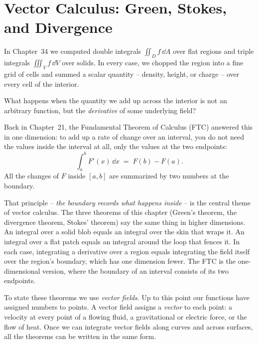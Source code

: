 \chapter{Vector Calculus: Green, Stokes, and Divergence}

\providecommand{\oiint}{\oint\kern-0.62em\oint}

In Chapter~34 we computed double integrals $\iint_D f\,\dd A$ over flat regions
and triple integrals $\iiint_V f\,\dd V$ over solids. In every case, we chopped
the region into a fine grid of cells and summed a scalar quantity -- density,
height, or charge -- over every cell of the interior.

What happens when the quantity we add up across the interior is not an arbitrary
function, but the \emph{derivative} of some underlying field?

Back in Chapter~21, the Fundamental Theorem of Calculus (FTC) answered this in one
dimension: to add up a rate of change over an interval, you do not need the values
inside the interval at all, only the values at the two endpoints:
\[
  \int_a^b F'(x)\,\dd x \;=\; F(b) - F(a).
\]
All the changes of $F$ inside $[a,b]$ are summarized by two numbers at the
boundary.

That principle -- \emph{the boundary records what happens inside} -- is the central
theme of vector calculus. The three theorems of this chapter (Green's theorem, the
divergence theorem, Stokes' theorem) say the same thing in higher dimensions.
An integral over a solid blob equals an integral over the skin that wraps it. An
integral over a flat patch equals an integral around the loop that fences it. In
each case, integrating a derivative over a region equals integrating the field
itself over the region's boundary, which has one dimension fewer. The FTC is the
one-dimensional version, where the boundary of an interval consists of its two
endpoints.

To state these theorems we use \emph{vector fields}. Up to this point our
functions have assigned numbers to points. A vector field assigns a
\emph{vector} to each point: a velocity at every point of a flowing fluid, a
gravitational or electric force, or the flow of heat. Once we can
integrate vector fields along curves and across surfaces, all the theorems can be
written in the same form.

